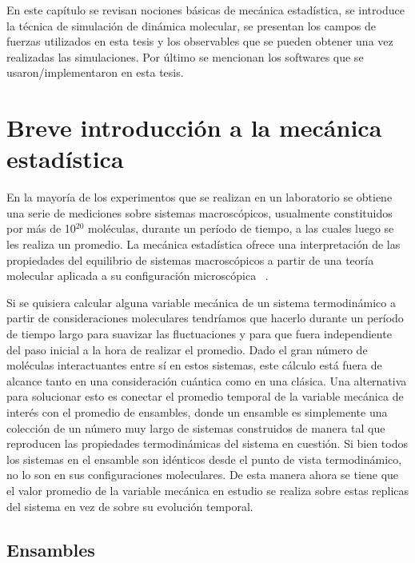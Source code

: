 \begin{adjustwidth}{50pt}{50pt}
    En este capítulo se revisan nociones básicas de mecánica estadística, se 
    introduce la técnica de simulación de dinámica molecular, se presentan los 
    campos de fuerzas utilizados en esta tesis y los observables que se pueden 
    obtener una vez realizadas las simulaciones. Por último se mencionan los 
    softwares que se usaron/implementaron en esta tesis.
\end{adjustwidth}

\section{Breve introducción a la mecánica estadística}

En la mayoría de los experimentos que se realizan en un laboratorio se obtiene 
una serie de mediciones sobre sistemas macroscópicos, usualmente constituidos por 
más de 10$^{20}$ moléculas, durante un período de tiempo, a las cuales luego se 
les realiza un promedio. La mecánica estadística ofrece una interpretación de 
las propiedades del equilibrio de sistemas macroscópicos a partir de una teoría 
molecular aplicada a su configuración microscópica ~\cite{hill1986}.

Si se quisiera calcular alguna variable mecánica de un sistema termodinámico a
partir de consideraciones moleculares tendríamos que hacerlo durante un período
de tiempo largo para suavizar las fluctuaciones y para que fuera independiente
del paso inicial a la hora de realizar el promedio. Dado el gran número de 
moléculas interactuantes entre sí en estos sistemas, este cálculo está fuera de
alcance tanto en una consideración cuántica como en una clásica. Una alternativa
para solucionar esto es conectar el promedio temporal de la variable mecánica de
interés con el promedio de ensambles, donde un ensamble es simplemente una 
colección de un número muy largo de sistemas construidos de manera tal que 
reproducen las propiedades termodinámicas del sistema en cuestión. Si bien todos
los sistemas en el ensamble son idénticos desde el punto de vista termodinámico,
no lo son en sus configuraciones moleculares. De esta manera ahora se tiene
que el valor promedio de la variable mecánica en estudio se realiza sobre estas 
replicas del sistema en vez de sobre su evolución temporal.

\subsection{Ensambles}

